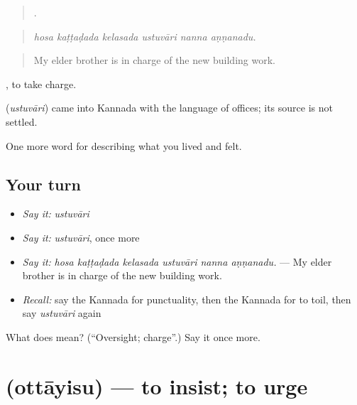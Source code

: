 \begin{quote}
     .
\end{quote}

\begin{quote}
\emph{hosa kaṭṭaḍada kelasada ustuvāri nanna aṇṇanadu.}
\end{quote}

\begin{quote}
My elder brother is in charge of the new building work.
\end{quote}

 , to take charge.

\begin{cousinweb}
\textbf{} (\emph{ustuvāri}) came into Kannada with the language of offices; its source is not settled.
\end{cousinweb}

\begin{grammarlens}[title={What you've built}]
One more word for describing what you lived and felt.
\end{grammarlens}

\subsection*{Your turn}
\begin{itemize}
\raggedright
  \item \emph{Say it:} \emph{ustuvāri}
  \item \emph{Say it:} \emph{ustuvāri}, once more
  \item \emph{Say it:} \emph{hosa kaṭṭaḍada kelasada ustuvāri nanna aṇṇanadu.} — My elder brother is in charge of the new building work.
  \item \emph{Recall:} say the Kannada for punctuality, then the Kannada for to toil, then say \emph{ustuvāri} again
\end{itemize}

\begin{tcolorbox}[breakable,colback=teal!4,colframe=teal!35!black,title={Before you move on}]
What does  mean? (\textquotedblleft{}Oversight; charge\textquotedblright{}.) Say it once more.
\end{tcolorbox}
\section[\texorpdfstring{\kn{ಒತ್ತಾಯಿಸು} (ottāyisu)}{ಒತ್ತಾಯಿಸು (ottāyisu)}]{ (ottāyisu) — to insist; to urge}

